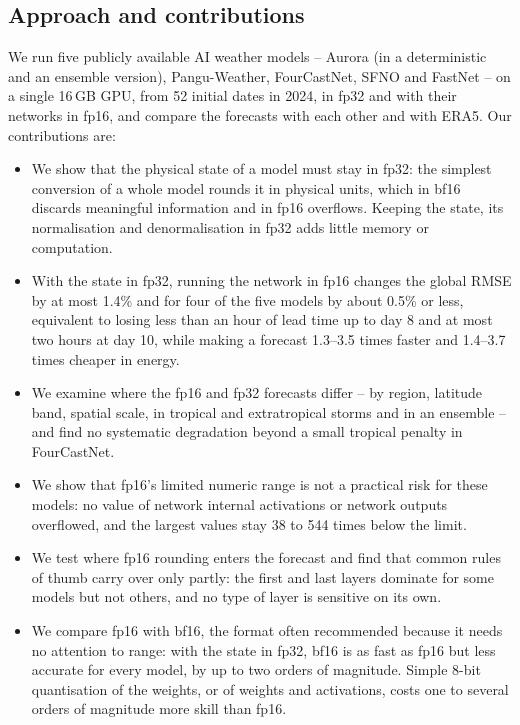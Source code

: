 \subsection{Approach and contributions}
\label{sec:intro-contributions}

We run five publicly available AI weather models -- Aurora (in a
deterministic and an ensemble version), Pangu-Weather, FourCastNet,
SFNO and FastNet -- on a single 16\,GB GPU, from 52 initial dates in
2024, in fp32 and with their networks in fp16, and compare the forecasts
with each other and with ERA5. Our contributions are:
\begin{itemize}
\item We show that the physical state of a model must stay in fp32: the
simplest conversion of a whole model rounds it in physical units, which
in bf16 discards meaningful information and in fp16 overflows. Keeping
the state, its normalisation and denormalisation in fp32 adds little
memory or computation.
\item With the state in fp32, running the network in fp16 changes the
global RMSE by at most 1.4\% and for four of the five models by about
0.5\% or less, equivalent to losing less than an hour of lead time up to
day 8 and at most two hours at day 10, while making a forecast 1.3--3.5
times faster and 1.4--3.7 times cheaper in energy.
\item We examine where the fp16 and fp32 forecasts differ -- by region,
latitude band, spatial scale, in tropical and extratropical storms and in
an ensemble -- and find no systematic degradation beyond a small
tropical penalty in FourCastNet.
\item We show that fp16's limited numeric range is not a practical risk for
these models: no value of network internal activations or network outputs
overflowed, and the largest values stay 38 to 544 times below the limit.
\item We test where fp16 rounding enters the forecast and find that
common rules of thumb carry over only partly: the first and last layers
dominate for some models but not others, and no type of layer is
sensitive on its own.
\item We compare fp16 with bf16, the format often recommended because it
needs no attention to range: with the state in fp32, bf16 is as fast as
fp16 but less accurate for every model, by up to two orders of magnitude.
Simple 8-bit quantisation of the weights, or of weights and activations,
costs one to several orders of magnitude more skill than fp16.
\end{itemize}

